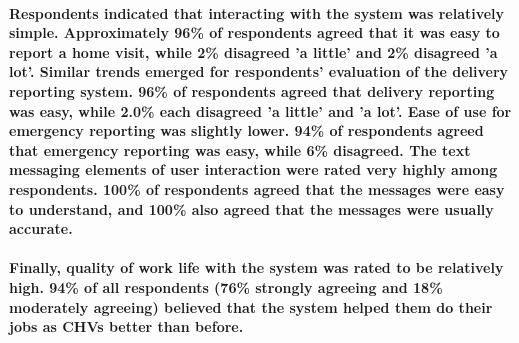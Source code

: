 \paragraph{Respondents indicated that interacting with the system was relatively simple.  Approximately 96\% of respondents agreed that it was easy to report a home visit, while 2\% disagreed 'a little' and 2\% disagreed 'a lot'. Similar trends emerged for respondents' evaluation of the delivery reporting system. 96\% of respondents  agreed that delivery reporting was easy, while 2.0\% each disagreed 'a little' and 'a lot'. Ease of use for emergency reporting was slightly lower. 94\% of respondents agreed that emergency reporting was easy, while 6\% disagreed. The text messaging elements of user interaction were rated very highly among respondents. 100\% of respondents agreed that the messages were easy to understand, and 100\% also agreed that the messages were usually accurate.}

\paragraph{Finally, quality of work life with the system was rated to be relatively high. 94\% of all respondents (76\% strongly agreeing and 18\% moderately agreeing) believed that the system helped them do their jobs as CHVs better than before.}





